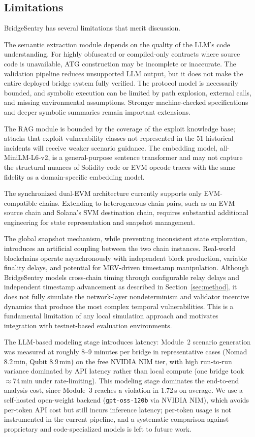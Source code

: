 \documentclass[journal]{IEEEtran}
\begin{document}
\subsection{Limitations}

BridgeSentry has several limitations that merit discussion.

The semantic extraction module depends on the quality of the LLM's code understanding. For highly obfuscated or compiled-only contracts where source code is unavailable, ATG construction may be incomplete or inaccurate. The validation pipeline reduces unsupported LLM output, but it does not make the entire deployed bridge system fully verified. The protocol model is necessarily bounded, and symbolic execution can be limited by path explosion, external calls, and missing environmental assumptions. Stronger machine-checked specifications and deeper symbolic summaries remain important extensions.

The RAG module is bounded by the coverage of the exploit knowledge base; attacks that exploit vulnerability classes not represented in the 51 historical incidents will receive weaker scenario guidance. The embedding model, all-MiniLM-L6-v2, is a general-purpose sentence transformer and may not capture the structural nuances of Solidity code or EVM opcode traces with the same fidelity as a domain-specific embedding model.

The synchronized dual-EVM architecture currently supports only EVM-compatible chains. Extending to heterogeneous chain pairs, such as an EVM source chain and Solana's SVM destination chain, requires substantial additional engineering for state representation and snapshot management.

The global snapshot mechanism, while preventing inconsistent state exploration, introduces an artificial coupling between the two chain instances. Real-world blockchains operate asynchronously with independent block production, variable finality delays, and potential for MEV-driven timestamp manipulation. Although BridgeSentry models cross-chain timing through configurable relay delays and independent timestamp advancement as described in Section~\ref{sec:method}, it does not fully simulate the network-layer nondeterminism and validator incentive dynamics that produce the most complex temporal vulnerabilities. This is a fundamental limitation of any local simulation approach and motivates integration with testnet-based evaluation environments.

The LLM-based modeling stage introduces latency: Module~2 scenario generation was measured at roughly 8--9 minutes per bridge in representative cases (Nomad 8.2\,min, Qubit 8.9\,min) on the free NVIDIA NIM tier, with high run-to-run variance dominated by API latency rather than local compute (one bridge took $\approx$74\,min under rate-limiting). This modeling stage dominates the end-to-end analysis cost, since Module~3 reaches a violation in 1.72\,s on average. We use a self-hosted open-weight backend (\texttt{gpt-oss-120b} via NVIDIA NIM), which avoids per-token API cost but still incurs inference latency; per-token usage is not instrumented in the current pipeline, and a systematic comparison against proprietary and code-specialized models is left to future work.
\end{document}
